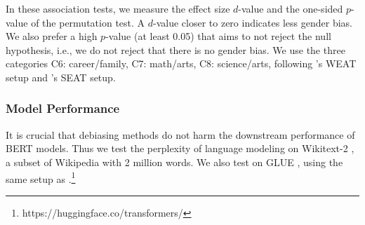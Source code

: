 %
In these association tests, we measure the effect size $d$-value and the
one-sided $p$-value of the permutation test.  A $d$-value closer to zero indicates less gender bias.  We also prefer a high $p$-value (at least 0.05) that aims to not reject the null hypothesis, i.e., we do not reject that there is no gender bias. We use the three categories C6: career/family, C7: math/arts, C8: science/arts, following 's WEAT setup and 's SEAT setup.

\subsubsection{Model Performance}
It is crucial that debiasing methods do not harm the downstream
performance of BERT models. Thus we test the perplexity of language modeling on Wikitext-2 \cite{merity2016pointer}, a subset of Wikipedia with 2 million words. We also test on GLUE  \cite{wang2018glue}, using the same setup as \cite{wolf2019huggingfaces}.\footnote{https://huggingface.co/transformers/}
